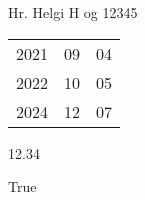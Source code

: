 \documentclass[10pt,a4paper]{article}
\begin{document}
	Hr. Helgi H og 12345

	\begin{tabular}{lll}
		2021 & 09 & 04\\
		2022 & 10 & 05\\
		2024 & 12 & 07
	\end{tabular}


	12.34
	
	
	True
\end{document}
